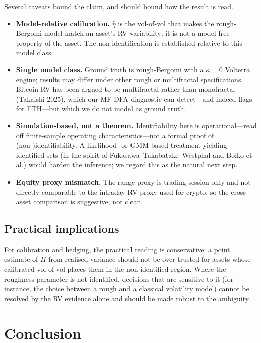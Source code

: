 \documentclass[11pt]{article}
\begin{document}
Several caveats bound the claim, and should bound how the result is read.
\begin{itemize}
\item \textbf{Model-relative calibration.} $\hat\eta$ is the vol-of-vol that makes
the rough-Bergomi model match an asset's RV variability; it is not a model-free
property of the asset. The non-identification is established relative to this model
class.
\item \textbf{Single model class.} Ground truth is rough-Bergomi with a
$\kappa = 0$ Volterra engine; results may differ under other rough or multifractal
specifications. Bitcoin RV has been argued to be multifractal rather than
monofractal (Takaishi 2025), which our MF-DFA diagnostic can detect---and indeed
flags for ETH---but which we do not model as ground truth.
\item \textbf{Simulation-based, not a theorem.} Identifiability here is
operational---read off finite-sample operating characteristics---not a formal proof
of (non-)identifiability. A likelihood- or GMM-based treatment yielding identified
sets (in the spirit of Fukasawa--Takabatake--Westphal and Bolko et al.) would harden
the inference; we regard this as the natural next step.
\item \textbf{Equity proxy mismatch.} The range proxy is trading-session-only and
not directly comparable to the intraday-RV proxy used for crypto, so the cross-asset
comparison is suggestive, not clean.
\end{itemize}

\subsection{Practical implications}

For calibration and hedging, the practical reading is conservative: a point estimate
of $H$ from realised variance should not be over-trusted for assets whose calibrated
vol-of-vol places them in the non-identified region. Where the roughness parameter
is not identified, decisions that are sensitive to it (for instance, the choice
between a rough and a classical volatility model) cannot be resolved by the RV
evidence alone and should be made robust to the ambiguity.

\section{Conclusion}
\end{document}
